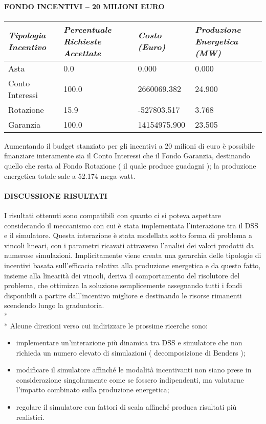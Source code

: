 \documentclass[12pt,a4paper,openright,twoside]{report}
\begin{document}
\paragraph{FONDO INCENTIVI – 20 MILIONI EURO}
\begin{center}
	\begin{tabular}{ | p{3.5cm} | p{3.5cm} | p{3.5cm} | p{3.5cm} | }
		\hline
		\nohyphens{\emph{Tipologia Incentivo}} & \nohyphens{\emph{Percentuale Richieste Accettate}} & \nohyphens{\emph{Costo (Euro)}} & \nohyphens{\emph{Produzione Energetica (MW)}} \\ \hline 
		Asta & 0.0 & 0.000 & 0.000 \\ \hline
		Conto Interessi & 100.0 & 2660069.382 & 24.900 \\ \hline
		Rotazione & 15.9 & -527803.517 & 3.768 \\ \hline
		Garanzia & 100.0 & 14154975.900 & 23.505 \\
		\hline
	\end{tabular}
\end{center}
Aumentando il budget stanziato per gli incentivi a 20 milioni di euro è possibile finanziare interamente sia il Conto Interessi che il Fondo Garanzia, destinando quello che resta al Fondo Rotazione ( il quale produce guadagni ); la produzione energetica totale sale a 52.174 mega-watt.
\paragraph{DISCUSSIONE RISULTATI}
I risultati ottenuti sono compatibili con quanto ci si poteva aspettare considerando  il meccanismo con cui è stata implementata l'interazione tra il DSS e il simulatore. Questa interazione è stata modellata sotto forma di problema a vincoli lineari, con i parametri ricavati attraverso l'analisi dei valori prodotti da numerose simulazioni. 
Implicitamente viene creata una gerarchia delle tipologie di incentivi basata sull'efficacia relativa alla produzione energetica e da questo fatto, insieme alla linearità dei vincoli, deriva il comportamento del risolutore del problema, che ottimizza la soluzione semplicemente assegnando tutti i fondi disponibili a partire dall'incentivo migliore e destinando le risorse rimanenti scendendo lungo la graduatoria. 
\\* \\*
Alcune direzioni verso cui indirizzare le prossime ricerche sono:
\begin{itemize}
	\item implementare un'interazione più dinamica tra DSS e simulatore che non richieda un numero elevato di simulazioni ( decomposizione di Benders );
	\item modificare il simulatore affinché le modalità incentivanti non siano prese in considerazione singolarmente come se fossero indipendenti, ma valutarne l'impatto combinato sulla produzione energetica;
	\item regolare il simulatore con fattori di scala affinché produca risultati più realistici.
\end{itemize}
\end{document}
